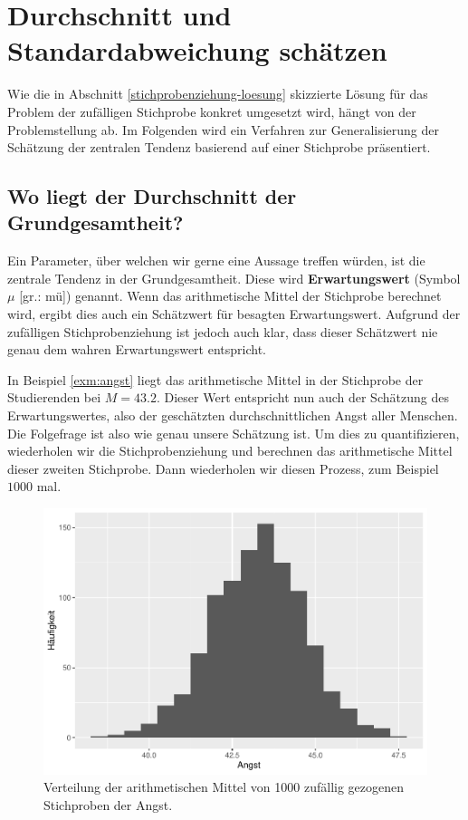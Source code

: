 \documentclass[
]{book}
\theoremstyle{definition}
\theoremstyle{definition}
\theoremstyle{definition}
\theoremstyle{definition}
\theoremstyle{remark}
\begin{document}
\chapter{Durchschnitt und Standardabweichung schätzen}\label{durchschnitt-und-standardabweichung-schuxe4tzen}

Wie die in Abschnitt \ref{stichprobenziehung-loesung} skizzierte Lösung für das Problem der zufälligen Stichprobe konkret umgesetzt wird, hängt von der Problemstellung ab. Im Folgenden wird ein Verfahren zur Generalisierung der Schätzung der zentralen Tendenz
basierend auf einer Stichprobe präsentiert.

\section{Wo liegt der Durchschnitt der Grundgesamtheit?}\label{wo-liegt-der-durchschnitt-der-grundgesamtheit}

Ein Parameter, über welchen wir gerne eine Aussage treffen würden, ist die zentrale Tendenz in der Grundgesamtheit. \label{customdef-erwartungswert}{Diese wird \textbf{Erwartungswert} (Symbol \(\mu\) {[}gr.: mü{]}) genannt.} Wenn das arithmetische Mittel der Stichprobe berechnet wird, ergibt dies auch ein Schätzwert für besagten Erwartungswert. Aufgrund der zufälligen Stichprobenziehung ist jedoch auch klar, dass dieser Schätzwert nie genau dem wahren Erwartungswert entspricht.

In Beispiel \ref{exm:angst} liegt das arithmetische Mittel in der Stichprobe der Studierenden bei \(M=43.2\). Dieser Wert entspricht nun auch der Schätzung des Erwartungswertes, also der geschätzten durchschnittlichen Angst aller Menschen. Die Folgefrage ist also wie genau unsere Schätzung ist. Um dies zu quantifizieren, wiederholen wir die Stichprobenziehung und berechnen das arithmetische Mittel dieser zweiten Stichprobe. Dann wiederholen wir diesen Prozess, zum Beispiel \(1000\) mal.

\begin{figure}

{\centering \includegraphics{aps_statistik1_files/figure-latex/exm-angst-hist-means-1} 

}

\caption{Verteilung der arithmetischen Mittel von 1000 zufällig gezogenen Stichproben der Angst.}\label{fig:exm-angst-hist-means}
\end{figure}
\end{document}
